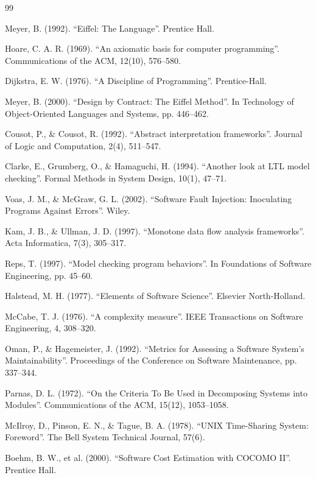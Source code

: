\documentclass[a4paper,12pt]{article}
\theoremstyle{definition}
\begin{document}
\begin{thebibliography}{99}

 Meyer, B. (1992). ``Eiffel: The Language''. Prentice Hall.

 Hoare, C. A. R. (1969). ``An axiomatic basis for computer programming''. Communications of the ACM, 12(10), 576--580.

 Dijkstra, E. W. (1976). ``A Discipline of Programming''. Prentice-Hall.

 Meyer, B. (2000). ``Design by Contract: The Eiffel Method''. In Technology of Object-Oriented Languages and Systems, pp. 446--462.

 Cousot, P., \& Cousot, R. (1992). ``Abstract interpretation frameworks''. Journal of Logic and Computation, 2(4), 511--547.

 Clarke, E., Grumberg, O., \& Hamaguchi, H. (1994). ``Another look at LTL model checking''. Formal Methods in System Design, 10(1), 47--71.

 Voas, J. M., \& McGraw, G. L. (2002). ``Software Fault Injection: Inoculating Programs Against Errors''. Wiley.

 Kam, J. B., \& Ullman, J. D. (1997). ``Monotone data flow analysis frameworks''. Acta Informatica, 7(3), 305--317.

 Reps, T. (1997). ``Model checking program behaviors''. In Foundations of Software Engineering, pp. 45--60.

 Halstead, M. H. (1977). ``Elements of Software Science''. Elsevier North-Holland.

 McCabe, T. J. (1976). ``A complexity measure''. IEEE Transactions on Software Engineering, 4, 308--320.

 Oman, P., \& Hagemeister, J. (1992). ``Metrics for Assessing a Software System's Maintainability''. Proceedings of the Conference on Software Maintenance, pp. 337--344.

 Parnas, D. L. (1972). ``On the Criteria To Be Used in Decomposing Systems into Modules''. Communications of the ACM, 15(12), 1053--1058.

 McIlroy, D., Pinson, E. N., \& Tague, B. A. (1978). ``UNIX Time-Sharing System: Foreword''. The Bell System Technical Journal, 57(6).

 Boehm, B. W., et al. (2000). ``Software Cost Estimation with COCOMO II''. Prentice Hall.


\end{thebibliography}
\end{document}
